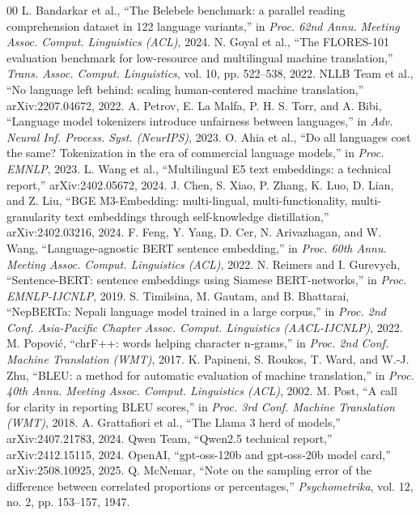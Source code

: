 \documentclass[conference]{IEEEtran}
\begin{document}
\begin{thebibliography}{00}
 L. Bandarkar et al., ``The Belebele benchmark: a parallel reading comprehension dataset in 122 language variants,'' in \emph{Proc. 62nd Annu. Meeting Assoc. Comput. Linguistics (ACL)}, 2024.
 N. Goyal et al., ``The FLORES-101 evaluation benchmark for low-resource and multilingual machine translation,'' \emph{Trans. Assoc. Comput. Linguistics}, vol. 10, pp. 522--538, 2022.
 NLLB Team et al., ``No language left behind: scaling human-centered machine translation,'' arXiv:2207.04672, 2022.
 A. Petrov, E. La Malfa, P. H. S. Torr, and A. Bibi, ``Language model tokenizers introduce unfairness between languages,'' in \emph{Adv. Neural Inf. Process. Syst. (NeurIPS)}, 2023.
 O. Ahia et al., ``Do all languages cost the same? Tokenization in the era of commercial language models,'' in \emph{Proc. EMNLP}, 2023.
 L. Wang et al., ``Multilingual E5 text embeddings: a technical report,'' arXiv:2402.05672, 2024.
 J. Chen, S. Xiao, P. Zhang, K. Luo, D. Lian, and Z. Liu, ``BGE M3-Embedding: multi-lingual, multi-functionality, multi-granularity text embeddings through self-knowledge distillation,'' arXiv:2402.03216, 2024.
 F. Feng, Y. Yang, D. Cer, N. Arivazhagan, and W. Wang, ``Language-agnostic BERT sentence embedding,'' in \emph{Proc. 60th Annu. Meeting Assoc. Comput. Linguistics (ACL)}, 2022.
 N. Reimers and I. Gurevych, ``Sentence-BERT: sentence embeddings using Siamese BERT-networks,'' in \emph{Proc. EMNLP-IJCNLP}, 2019.
 S. Timilsina, M. Gautam, and B. Bhattarai, ``NepBERTa: Nepali language model trained in a large corpus,'' in \emph{Proc. 2nd Conf. Asia-Pacific Chapter Assoc. Comput. Linguistics (AACL-IJCNLP)}, 2022.
 M. Popovi\'c, ``chrF++: words helping character n-grams,'' in \emph{Proc. 2nd Conf. Machine Translation (WMT)}, 2017.
 K. Papineni, S. Roukos, T. Ward, and W.-J. Zhu, ``BLEU: a method for automatic evaluation of machine translation,'' in \emph{Proc. 40th Annu. Meeting Assoc. Comput. Linguistics (ACL)}, 2002.
 M. Post, ``A call for clarity in reporting BLEU scores,'' in \emph{Proc. 3rd Conf. Machine Translation (WMT)}, 2018.
 A. Grattafiori et al., ``The Llama 3 herd of models,'' arXiv:2407.21783, 2024.
 Qwen Team, ``Qwen2.5 technical report,'' arXiv:2412.15115, 2024.
 OpenAI, ``gpt-oss-120b and gpt-oss-20b model card,'' arXiv:2508.10925, 2025.
 Q. McNemar, ``Note on the sampling error of the difference between correlated proportions or percentages,'' \emph{Psychometrika}, vol. 12, no. 2, pp. 153--157, 1947.
\end{thebibliography}

\balance
\end{document}
